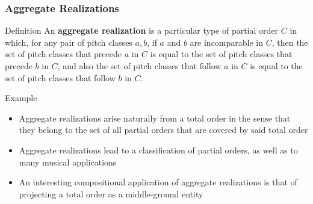 
\begin{frame}
	\frametitle{Aggregate Realizations}
	\begin{block}{Definition}
		An \textbf{aggregate realization} is a particular type of partial order $C$ in which, for any pair of pitch classes $a, b$, if $a$ and $b$ are incomparable in $C$, then the set of pitch classes that precede $a$ in $C$ is equal to the set of pitch classes that precede $b$ in $C$, and also the set of pitch classes that follow $a$ in $C$ is equal to the set of pitch classes that follow $b$ in $C$.
	\end{block}
	\begin{block}{Example}
		\begin{itemize}
			\item Aggregate realizations arise naturally from a total order in the sense that they belong to the set of all partial orders that are covered by said total order
			\item Aggregate realizations lead to a classification of partial orders, as well as to many musical applications
			\item An interesting compositional application of aggregate realizations is that of projecting a total order as a middle-ground entity
		\end{itemize}
	\end{block}
\end{frame}

